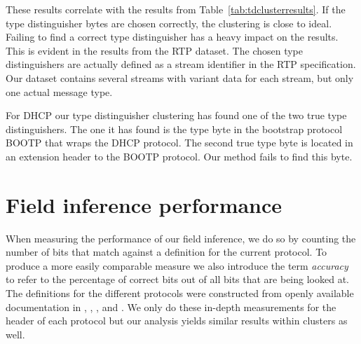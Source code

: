 \documentclass[a4paper]{report}
\begin{document}
These results correlate with the results from Table~\ref{tab:tdclusterresults}.
If the type distinguisher bytes are chosen correctly, the clustering is close
to ideal. Failing to find a correct type distinguisher has a heavy impact on
the results. This is evident in the results from the RTP dataset. The chosen
type distinguishers are actually defined as a stream identifier in the RTP
specification. Our dataset contains several streams with variant data for
each stream, but only one actual message type.

For DHCP our type distinguisher clustering has found one of the two true
type distinguishers. The one it has found is the type byte in the
bootstrap protocol BOOTP that wraps the DHCP protocol. The second true type
byte is located in an extension header to the BOOTP protocol. Our method fails
to find this byte.


\section{Field inference performance}
\label{sec:fieldperf}
%
When measuring the performance of our field inference, we do so by counting the
number of bits that match against a definition for the current protocol. To
produce a more easily comparable measure we also introduce the term
\emph{accuracy} to refer to the percentage of correct bits out of all bits that
are being looked at. The definitions for the different protocols were
constructed from openly available documentation in ,
, , 
and . We only do these in-depth measurements for the
header of each protocol but our analysis yields similar results within clusters
as well.
\end{document}
